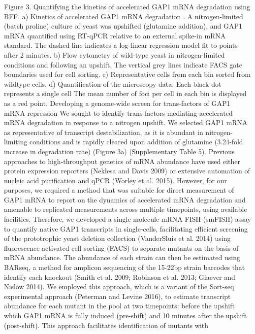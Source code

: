 Figure 3. Quantifying the kinetics of accelerated GAP1 mRNA
degradation using BFF.  a) Kinetics of accelerated GAP1 mRNA
degradation . A nitrogen-limited (batch proline) culture of yeast was
upshifted (glutamine addition), and GAP1 mRNA quantified using RT-qPCR
relative to an external spike-in mRNA standard. The dashed line
indicates a log-linear regression model fit to points after 2 minutes.
b) Flow cytometry of wild-type yeast in nitrogen-limited conditions
and following an upshift. The vertical grey lines indicate FACS gate
boundaries used for cell sorting. c) Representative cells  from each
bin sorted from wildtype cells. d) Quantification of the microscopy
data. Each black dot represents a single cell  The mean number of foci
per cell in  each bin  is displayed as a red point.  Developing a
genome-wide screen for trans-factors of GAP1 mRNA repression We sought
to identify trans-factors mediating accelerated mRNA degradation in
response to a nitrogen upshift. We selected GAP1 mRNA as
representative of transcript destabilization, as it is abundant in
nitrogen-limiting conditions and is rapidly cleared upon addition of
glutamine  (3.24-fold increase in degradation rate) (Figure 3a)
(Supplementary Table 5). Previous approaches to high-throughput
genetics of mRNA abundance have used either protein expression
reporters (Neklesa and Davis 2009) or extensive automation of nucleic
acid purification and qPCR (Worley et al. 2015). However, for our
purposes, we required a method that was suitable for direct
measurement of GAP1 mRNA to report on the dynamics of accelerated mRNA
degradation and amenable to replicated measurements across multiple
timepoints, using available facilities. Therefore, we developed a
single molecule mRNA FISH (smFISH) assay to quantify native GAP1
transcripts in single-cells, facilitating efficient screening of the
prototrophic yeast deletion collection (VanderSluis et al. 2014) using
fluorescence activated cell sorting (FACS) to separate mutants on the
basis of mRNA abundance. The abundance of each strain can then be
estimated using BARseq, a method for amplicon sequencing of the
15-22bp strain barcodes that identify each knockout (Smith et al.
2009; Robinson et al. 2013; Giaever and Nislow 2014). We employed this
approach, which is a variant of the Sort-seq experimental approach
(Peterman and Levine 2016), to estimate transcript abundance for each
mutant in the pool at two timepoints: before the upshift which GAP1
mRNA is fully induced (pre-shift) and 10 minutes after the upshift
(post-shift). This approach facilitates identification of mutants with
